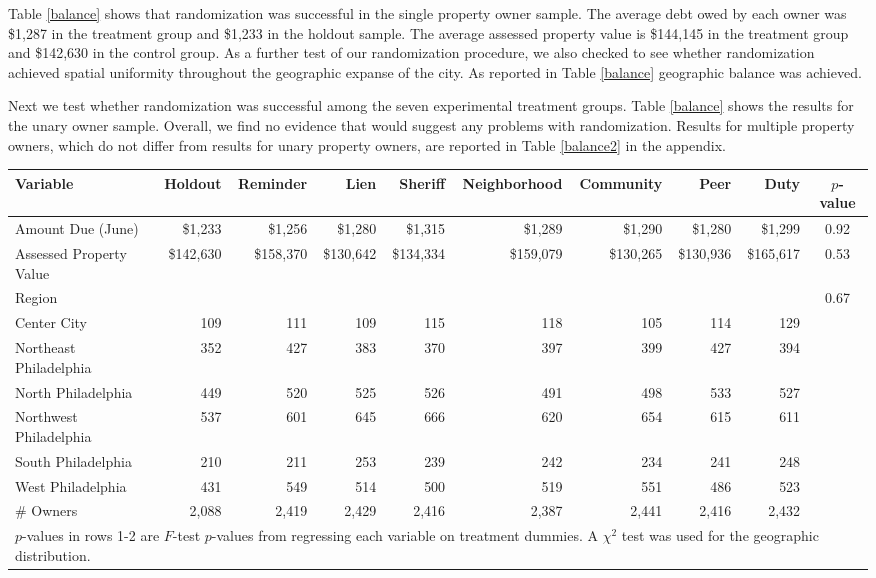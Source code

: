 \documentclass[12pt]{article}
\begin{document}
Table \ref{balance} shows that randomization was successful in the
single property owner sample.  The average debt owed by each owner was \$1,287
in the treatment group and \$1,233 in the holdout sample. The average
assessed property value is \$144,145 in the treatment group and
\$142,630 in the control group. As a further test of our randomization
procedure, we also checked to see whether randomization achieved
spatial uniformity throughout the geographic expanse of the city. As
reported in Table \ref{balance} geographic balance was achieved.

Next we test whether randomization was successful among the seven
experimental treatment groups. Table \ref{balance} shows the results
for the unary owner sample. Overall, we find no evidence that would
suggest any problems with randomization. Results for multiple property
owners, which do not differ from results for unary property owners,
are reported in Table \ref{balance2} in the appendix.

\begin{sidewaystable}[htbp]
\centering
\caption{Balance on Observables (Single Property Owners)}
\label{balance}
\vspace{10mm}
\begin{tabular}{lrrrrrrrrc}
\hline
  \hline
Variable & Holdout & Reminder & Lien & Sheriff & Neighborhood & Community & Peer & Duty & $p$-value \\ 
   \hline
Amount Due (June) & \$1,233 & \$1,256 & \$1,280 & \$1,315 & \$1,289 & \$1,290 & \$1,280 & \$1,299 & 0.92 \\ 
  Assessed Property Value & \$142,630 & \$158,370 & \$130,642 & \$134,334 & \$159,079 & \$130,265 & \$130,936 & \$165,617 & 0.53 \\ 
   \hline
  Region & & & & & & & & & 0.67 \\
  \enskip Center City & 109 & 111 & 109 & 115 & 118 & 105 & 114 & 129 & \\ 
  \enskip Northeast Philadelphia & 352 & 427 & 383 & 370 & 397 & 399 & 427 & 394 &  \\ 
  \enskip North Philadelphia & 449 & 520 & 525 & 526 & 491 & 498 & 533 & 527 &  \\ 
  \enskip Northwest Philadelphia & 537 & 601 & 645 & 666 & 620 & 654 & 615 & 611 &  \\ 
  \enskip South Philadelphia & 210 & 211 & 253 & 239 & 242 & 234 & 241 & 248 &  \\ 
  \enskip West Philadelphia & 431 & 549 & 514 & 500 & 519 & 551 & 486 & 523 &  \\ 
   \hline
\# Owners & 2,088 & 2,419 & 2,429 & 2,416 & 2,387 & 2,441 & 2,416 & 2,432 &  \\ 
  \hline

\multicolumn{10}{l}{\scriptsize{$p$-values in rows 1-2 are $F$-test
    $p$-values from regressing each variable on treatment dummies. A
    $\chi^2$ test was used for the geographic distribution.}} \\
\end{tabular}
\end{sidewaystable}
\end{document}

